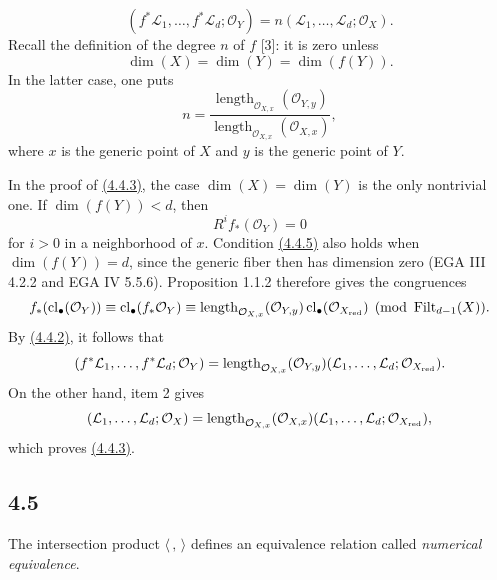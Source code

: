 \begin{enumerate}[label=\arabic*)]
\begin{equation}\tag{4.4.3}
(f^*\mathcal L_1,\ldots,f^*\mathcal L_d;\mathcal O_Y)
=n(\mathcal L_1,\ldots,\mathcal L_d;\mathcal O_X).
\end{equation}
Recall the definition of the degree $n$ of $f$ [3]: it is zero unless
\[
\dim(X)=\dim(Y)=\dim(f(Y)).
\]
In the latter case, one puts
\begin{equation}\tag{4.4.4}
n=
\frac{\operatorname{length}_{\mathcal O_{X,x}}(\mathcal O_{Y,y})}
{\operatorname{length}_{\mathcal O_{X,x}}(\mathcal O_{X,x})},
\end{equation}
where $x$ is the generic point of $X$ and $y$ is the generic point of $Y$.
\end{enumerate}

In the proof of \hyperlink{sga6.e10.eq.4-4-3}{(4.4.3)}, the case $\dim(X)=\dim(Y)$ is the only nontrivial
one. If $\dim(f(Y))<d$, then
\begin{equation}\tag{4.4.5}
R^if_*(\mathcal O_Y)=0
\end{equation}
for $i>0$ in a neighborhood of $x$. Condition \hyperlink{sga6.e10.eq.4-4-5}{(4.4.5)} also holds when
$\dim(f(Y))=d$, since the generic fiber then has dimension zero (EGA III
4.2.2 and EGA IV 5.5.6). Proposition 1.1.2 therefore gives the congruences
\[
f_*(\operatorname{cl}_\bullet(\mathcal O_Y))
\equiv\operatorname{cl}_\bullet(f_*\mathcal O_Y)
\equiv\operatorname{length}_{\mathcal O_{X,x}}(\mathcal O_{Y,y})
\operatorname{cl}_\bullet(\mathcal O_{X_{\mathrm{red}}})
\pmod{\operatorname{Filt}_{d-1}(X)}.
\]
By \hyperlink{sga6.e10.eq.4-4-2}{(4.4.2)}, it follows that
\[
(f^*\mathcal L_1,\ldots,f^*\mathcal L_d;\mathcal O_Y)
=\operatorname{length}_{\mathcal O_{X,x}}(\mathcal O_{Y,y})
(\mathcal L_1,\ldots,\mathcal L_d;\mathcal O_{X_{\mathrm{red}}}).
\]
On the other hand, item 2 gives
\[
(\mathcal L_1,\ldots,\mathcal L_d;\mathcal O_X)
=\operatorname{length}_{\mathcal O_{X,x}}(\mathcal O_{X,x})
(\mathcal L_1,\ldots,\mathcal L_d;\mathcal O_{X_{\mathrm{red}}}),
\]
which proves \hyperlink{sga6.e10.eq.4-4-3}{(4.4.3)}.

\subsection*{4.5}
The intersection product $\langle\, ,\,\rangle$ defines an equivalence
relation called \emph{numerical equivalence}.

